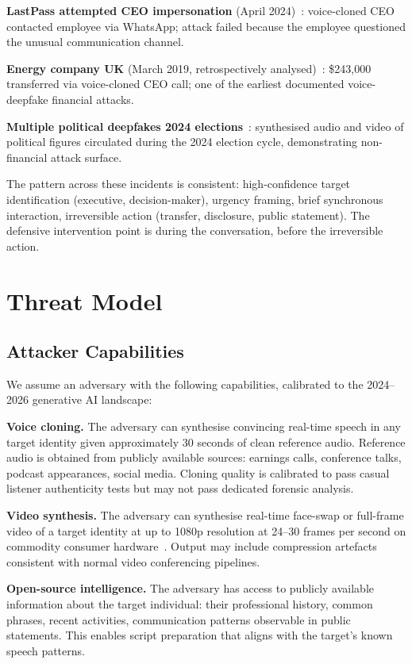 \documentclass[sigconf,nonacm]{acmart}
\begin{document}
\textbf{LastPass attempted CEO impersonation} (April
2024)~\cite{lastpass2024deepfake}: voice-cloned CEO contacted
employee via WhatsApp; attack failed because the employee questioned
the unusual communication channel.

\textbf{Energy company UK} (March 2019, retrospectively
analysed)~\cite{energy2019voice}: \$243{,}000 transferred via
voice-cloned CEO call; one of the earliest documented voice-deepfake
financial attacks.

\textbf{Multiple political deepfakes 2024
elections}~\cite{politico2024deepfake}: synthesised audio and video of
political figures circulated during the 2024 election cycle, demonstrating
non-financial attack surface.

The pattern across these incidents is consistent: high-confidence target
identification (executive, decision-maker), urgency framing, brief
synchronous interaction, irreversible action (transfer, disclosure,
public statement). The defensive intervention point is during the
conversation, before the irreversible action.

\section{Threat Model}

\subsection{Attacker Capabilities}

We assume an adversary with the following capabilities, calibrated to
the 2024--2026 generative AI landscape:

\textbf{Voice cloning.} The adversary can synthesise convincing
real-time speech in any target identity given approximately 30 seconds
of clean reference audio. Reference audio is obtained from publicly
available sources: earnings calls, conference talks, podcast appearances,
social media. Cloning quality is calibrated to pass casual listener
authenticity tests but may not pass dedicated forensic analysis.

\textbf{Video synthesis.} The adversary can synthesise real-time face-swap
or full-frame video of a target identity at up to 1080p resolution at
24--30 frames per second on commodity consumer
hardware~\cite{rana2024videosurv}. Output may include compression
artefacts consistent with normal video conferencing pipelines.

\textbf{Open-source intelligence.} The adversary has access to
publicly available information about the target individual: their
professional history, common phrases, recent activities, communication
patterns observable in public statements. This enables script
preparation that aligns with the target's known speech patterns.
\end{document}
